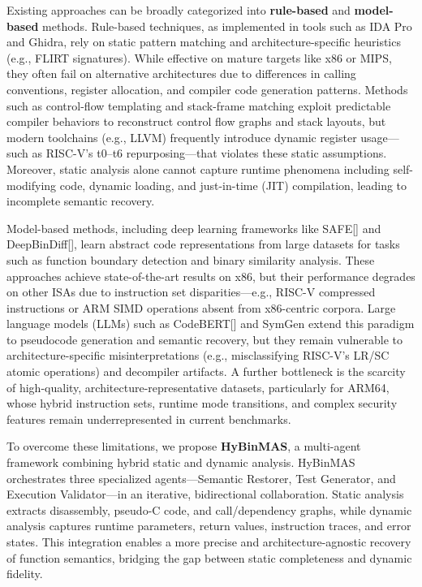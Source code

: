 \documentclass[acmsmall,screen,review,anonymous]{acmart} %
\begin{document}
Existing approaches can be broadly categorized into \textbf{rule-based} and \textbf{model-based} methods. Rule-based techniques, as implemented in tools such as IDA Pro\cite{ida_pro} and Ghidra\cite{Ghidra}, rely on static pattern matching and architecture-specific heuristics (e.g., FLIRT signatures). While effective on mature targets like x86 or MIPS, they often fail on alternative architectures due to differences in calling conventions, register allocation, and compiler code generation patterns\cite{binariesanalysis}. Methods such as control-flow templating and stack-frame matching exploit predictable compiler behaviors to reconstruct control flow graphs and stack layouts, but modern toolchains (e.g., LLVM) frequently introduce dynamic register usage—such as RISC-V’s t0–t6 repurposing—that violates these static assumptions. Moreover, static analysis alone cannot capture runtime phenomena including self-modifying code, dynamic loading, and just-in-time (JIT) compilation, leading to incomplete semantic recovery.

Model-based methods, including deep learning frameworks like SAFE[] and DeepBinDiff[], learn abstract code representations from large datasets for tasks such as function boundary detection and binary similarity analysis. These approaches achieve state-of-the-art results on x86, but their performance degrades on other ISAs due to instruction set disparities—e.g., RISC-V compressed instructions or ARM SIMD operations absent from x86-centric corpora. Large language models (LLMs) such as CodeBERT[] and SymGen\cite{SymGen} extend this paradigm to pseudocode generation and semantic recovery, but they remain vulnerable to architecture-specific misinterpretations (e.g., misclassifying RISC-V’s LR/SC atomic operations) and decompiler artifacts. A further bottleneck is the scarcity of high-quality, architecture-representative datasets, particularly for ARM64, whose hybrid instruction sets, runtime mode transitions, and complex security features remain underrepresented in current benchmarks.

To overcome these limitations, we propose \textbf{HyBinMAS}, a multi-agent framework combining hybrid static and dynamic analysis. HyBinMAS orchestrates three specialized agents—Semantic Restorer, Test Generator, and Execution Validator—in an iterative, bidirectional collaboration. Static analysis extracts disassembly, pseudo-C code, and call/dependency graphs, while dynamic analysis captures runtime parameters, return values, instruction traces, and error states. This integration enables a more precise and architecture-agnostic recovery of function semantics, bridging the gap between static completeness and dynamic fidelity.
\end{document}
